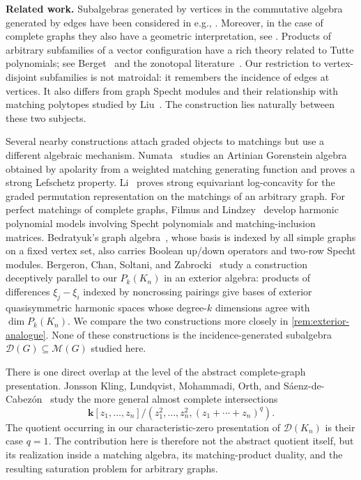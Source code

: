 \documentclass[12pt]{amsart}
\theoremstyle{definition}
\theoremstyle{remark}
\newcommand{\kk}{\mathbf{k}}
\begin{document}
\medskip
\textbf{Related work.} 
Subalgebras generated by vertices in the commutative algebra
 generated by edges have been considered in e.g., \cite{PS, PShSh}.
Moreover, in the case of complete graphs they also have a geometric
interpretation, see \cite{ShSh3}.  
Products of arbitrary subfamilies of a vector configuration have a rich
theory related to Tutte polynomials; see Berget~\cite{Berget} and the
zonotopal literature~\cite{AP,HR}.  Our restriction to vertex-disjoint
subfamilies is not matroidal: it remembers the incidence of edges at vertices.
It also differs from graph Specht modules and their relationship with matching
polytopes studied by Liu~\cite{LiuMatching}.  The construction lies naturally
between these two subjects. 

Several nearby constructions attach graded objects to matchings but use a
different algebraic mechanism.  Numata~\cite{Numata} studies an Artinian
Gorenstein algebra obtained by apolarity from a weighted matching generating
function and proves a strong Lefschetz property.  Li~\cite{Li} proves strong
equivariant log-concavity for the graded permutation representation on the
matchings of an arbitrary graph.  For perfect matchings of complete graphs,
Filmus and Lindzey~\cite{FL} develop harmonic polynomial models involving
Specht polynomials and matching-inclusion matrices.  Bedratyuk's graph
algebra~\cite{Bedratyuk}, whose basis is indexed by all simple graphs on a
fixed vertex set, also carries Boolean up/down operators and two-row Specht
modules.  Bergeron, Chan, Soltani, and Zabrocki~\cite{BCSZ} study a
construction deceptively parallel to our $P_k(K_n)$ in an exterior algebra: products of differences
$\xi_j-\xi_i$ indexed by noncrossing pairings give bases of exterior
quasisymmetric harmonic spaces whose degree-$k$ dimensions agree with $\dim P_k(K_n)$.  We compare the two constructions more closely in
\cref{rem:exterior-analogue}.  None of these constructions is the
incidence-generated subalgebra $\mathcal D(G)\subseteq\mathcal M(G)$ studied
here.

There is one direct overlap at the level of the abstract complete-graph
presentation.  Jonsson Kling, Lundqvist, Mohammadi, Orth, and
S\'{a}enz-de-Cabez\'{o}n~\cite{JKLMOS} study the more general almost complete
intersections
\[
 \kk[z_1,\ldots,z_n]/(z_1^2,\ldots,z_n^2,(z_1+\cdots+z_n)^q).
\]
The quotient occurring in our characteristic-zero presentation of
$\mathcal D(K_n)$ is their case $q=1$.
The contribution here is therefore not the abstract quotient itself, but its
realization inside a matching algebra, its matching-product duality, and the
resulting saturation problem for arbitrary graphs.
\end{document}
